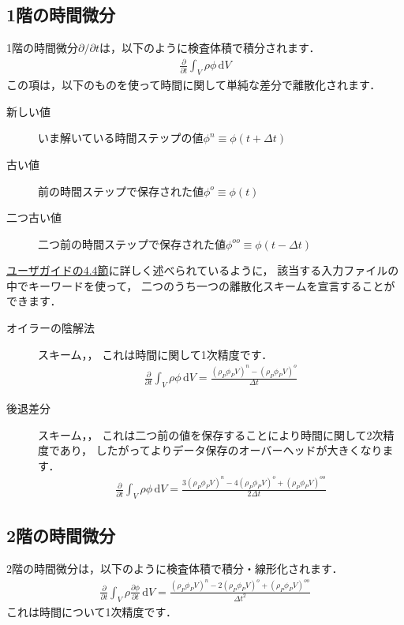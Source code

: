 \subsection{1階の時間微分}
\label{ssec:2.4.3}
1階の時間微分$\partial/\partial t$は，以下のように検査体積で積分されます．
\begin{align}
 \label{eq:2.20}
 \frac{\partial}{\partial t}\int_{V}\rho\phi\,\mathrm{d}V
\end{align}
この項は，以下のものを使って時間に関して単純な差分で離散化されます．
\begin{description}
 \item[新しい値] いま解いている時間ステップの値$\phi^{n} \equiv \phi(t + \Delta t)$
 \item[古い値] 前の時間ステップで保存された値$\phi^{o} \equiv \phi(t)$
 \item[二つ古い値] 二つ前の時間ステップで保存された値$\phi^{oo} \equiv \phi(t - \Delta t)$
\end{description}
\href{../UserGuideJa/UserGuideJa.pdf#section.4.4}{ユーザガイドの4.4節}に詳しく述べられているように，
該当する入力ファイルの中でキーワードを使って，
二つのうち一つの離散化スキームを宣言することができます．
\begin{description}
 \item[オイラーの陰解法] スキーム，，
            これは時間に関して1次精度です．
            \begin{align}
             \label{eq:2.21}
             \frac{\partial}{\partial t}\int_{V}\rho\phi\,\mathrm{d}V
             = \frac{(\rho_{P}\phi_{P}V)^{n} - (\rho_{P}\phi_{P}V)^{o}}{\Delta t}
            \end{align}
 \item[後退差分] スキーム，，
            これは二つ前の値を保存することにより時間に関して2次精度であり，
            したがってよりデータ保存のオーバーヘッドが大きくなります．
            \begin{align}
             \label{eq:2.22}
             \frac{\partial}{\partial t}\int_{V}\rho\phi\,\mathrm{d}V
             = \frac{3(\rho_{P}\phi_{P}V)^{n} - 4(\rho_{P}\phi_{P}V)^{o}
             + (\rho_{P}\phi_{P}V)^{oo}}{2\Delta t}
            \end{align}
\end{description}


\subsection{2階の時間微分}
\label{ssec:2.4.4}
2階の時間微分は，以下のように検査体積で積分・線形化されます．
\begin{align}
 \label{eq:2.23}
 \frac{\partial}{\partial t}\int_{V}\rho\frac{\partial\phi}{\partial t}\,\mathrm{d}V
 = \frac{(\rho_{P}\phi_{P}V)^{n} - 2(\rho_{P}\phi_{P}V)^{o}
 + (\rho_{P}\phi_{P}V)^{oo}}{\Delta t^{2}}
\end{align}
これは時間について1次精度です．


